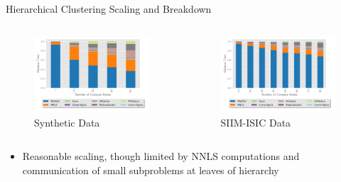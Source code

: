 \documentclass{beamer}
\newcommand{\image}{SIIM-ISIC}
\begin{document}
\begin{frame}{Hierarchical Clustering Scaling and Breakdown}
\begin{columns}
    \end{columns}
\vspace{-.5cm}
    \begin{columns}
        \begin{column}{0.5\textwidth}
            \begin{figure}
            \includegraphics[width=\figscal]{../plots/synthetic_hier_strongscaling.pdf}
            \caption{Synthetic  Data}
            \end{figure}
        \end{column}
        \begin{column}{0.5\textwidth}
            \begin{figure}
            \includegraphics[width=\figscal]{../plots/realworld_hier_strongscaling.pdf}
            \caption{\image{} Data}
            \end{figure}
        \end{column}
    \end{columns}
    
\begin{itemize}
\small
    \item Reasonable scaling, though limited by NNLS computations and communication of small subproblems at leaves of hierarchy
\end{itemize}
    
\end{frame}
\end{document}
